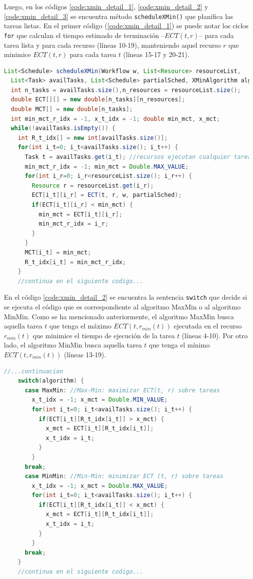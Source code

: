 Luego, en los códigos \ref{code:xmin_detail_1}, \ref{code:xmin_detail_2} y \ref{code:xmin_detail_3} se encuentra método \texttt{scheduleXMin()} que planifica las tareas listas. En el primer código (\ref{code:xmin_detail_1}) se puede notar los ciclos \texttt{for} que calculan el tiempo estimado de terminación --$ECT(t,r)$-- para cada tarea lista y para cada recurso (líneas 10-19), manteniendo aquel recurso $r$ que minimice $ECT(t,r)$ para cada tarea $t$ (líneas 15-17 y 20-21).

\begin{lstlisting}[language=java,label={code:xmin_detail_1},caption={Método de MaxMin/MinMin que planifica las tareas (parte 1)},float]
List<Schedule> scheduleXMin(Workflow w, List<Resource> resourceList, 
  List<Task> availTasks, List<Schedule> partialSched, XMinAlgorithm algorithm) {
  int n_tasks = availTasks.size(),n_resources = resourceList.size();
  double ECT[][] = new double[n_tasks][n_resources];
  double MCT[] = new double[n_tasks];
  int min_mct_r_idx = -1, x_t_idx = -1; double min_mct, x_mct;
  while(!availTasks.isEmpty()) {
    int R_t_idx[] = new int[availTasks.size()];
    for(int i_t=0; i_t<availTasks.size(); i_t++) {
      Task t = availTasks.get(i_t); //recursos ejecutan cualquier tarea
      min_mct_r_idx = -1; min_mct = Double.MAX_VALUE;
      for(int i_r=0; i_r<resourceList.size(); i_r++) {
        Resource r = resourceList.get(i_r);
        ECT[i_t][i_r] = ECT(t, r, w, partialSched);
        if(ECT[i_t][i_r] < min_mct) {
          min_mct = ECT[i_t][i_r];
          min_mct_r_idx = i_r;
        }
      }
      MCT[i_t] = min_mct;
      R_t_idx[i_t] = min_mct_r_idx;
    }
    //continua en el siguiente codigo...
\end{lstlisting}

En el código \ref{code:xmin_detail_2} se encuentra la sentencia \texttt{switch} que decide si se ejecuta el código que es correspondiente al algoritmo MaxMin o al algoritmo MinMin. Como se ha mencionado anteriormente, el algoritmo MaxMin busca aquella tarea $t$ que tenga el máximo $ECT(t,r_{min}(t))$ ejecutada en el recurso $r_{min}(t)$ que minimice el tiempo de ejecución de la tarea $t$ (líneas 4-10). Por otro lado, el algoritmo MinMin busca aquella tarea $t$ que tenga el mínimo $ECT(t,r_{min}(t))$ (líneas 13-19).

\begin{lstlisting}[language=java,label={code:xmin_detail_2},caption={Método de MaxMin/MinMin que planifica las tareas (parte 2)},float]
    //...continuacion
    switch(algorithm) {
      case MaxMin: //Max-Min: maximizar ECT(t, r) sobre tareas
        x_t_idx = -1; x_mct = Double.MIN_VALUE;
        for(int i_t=0; i_t<availTasks.size(); i_t++) {
          if(ECT[i_t][R_t_idx[i_t]] > x_mct) {
            x_mct = ECT[i_t][R_t_idx[i_t]];
            x_t_idx = i_t;
          }
        }
      break;
      case MinMin: //Min-Min: minimizar ECT (t, r) sobre tareas
        x_t_idx = -1; x_mct = Double.MAX_VALUE;
        for(int i_t=0; i_t<availTasks.size(); i_t++) {
          if(ECT[i_t][R_t_idx[i_t]] < x_mct) {
            x_mct = ECT[i_t][R_t_idx[i_t]];
            x_t_idx = i_t;
          }
        }
      break;
    }
    //continua en el siguiente codigo...
\end{lstlisting}

